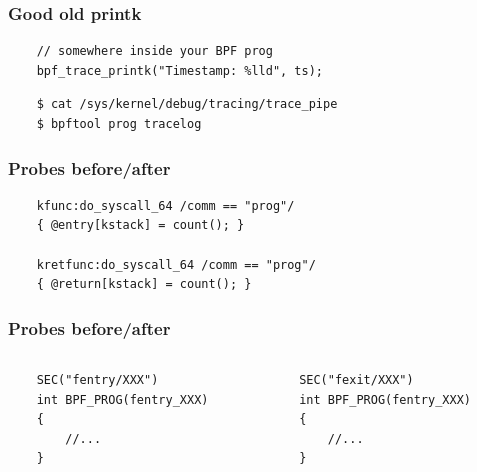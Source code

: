 \documentclass[usenames,dvipsnames, 18pt, compress, aspectratio=169]{beamer}
\begin{document}
\begin{frame}[fragile]{}
    \frametitle{Good old printk}

    \begin{center}
        \begin{verbatim}
    // somewhere inside your BPF prog
    bpf_trace_printk("Timestamp: %lld", ts);
        \end{verbatim}
        \vspace{0.5cm}
        \begin{verbatim}
    $ cat /sys/kernel/debug/tracing/trace_pipe
    $ bpftool prog tracelog
        \end{verbatim}
    \end{center}
\end{frame}

\begin{frame}[fragile]{}
    \frametitle{Probes before/after}

    \begin{center}
        \begin{verbatim}
    kfunc:do_syscall_64 /comm == "prog"/
    { @entry[kstack] = count(); }

    kretfunc:do_syscall_64 /comm == "prog"/
    { @return[kstack] = count(); }
        \end{verbatim}
    \end{center}
\end{frame}

\begin{frame}[fragile]{}
    \frametitle{Probes before/after}

    \begin{center}
        \begin{columns}
            \begin{column}{0.5\textwidth}
                \begin{verbatim}
    SEC("fentry/XXX")
    int BPF_PROG(fentry_XXX)
    {
        //...
    }
               \end{verbatim}
           \end{column}

           \begin{column}{0.5\textwidth}
               \begin{verbatim}
    SEC("fexit/XXX")
    int BPF_PROG(fentry_XXX)
    {
        //...
    }
                \end{verbatim}
            \end{column}
        \end{columns}
    \end{center}
\end{frame}
\end{document}
